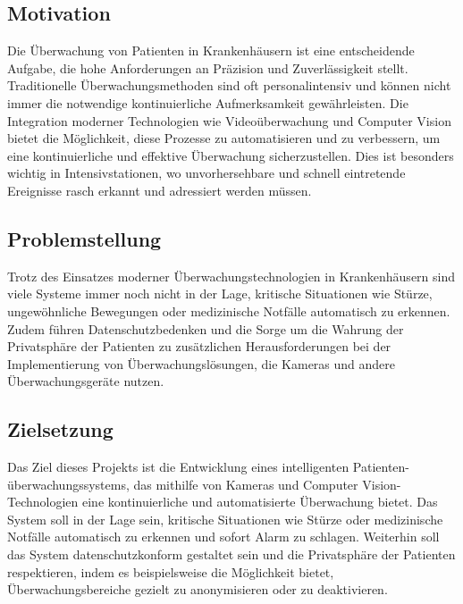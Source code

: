 \clearpage
\subsection{Motivation}
Die Überwachung von Patienten in Krankenhäusern ist eine entscheidende Aufgabe, die hohe Anforderungen an Präzision und Zuverlässigkeit stellt. Traditionelle Überwachungsmethoden sind oft personalintensiv und können nicht immer die notwendige kontinuierliche Aufmerksamkeit gewährleisten. Die Integration moderner Technologien wie Videoüberwachung und Computer Vision bietet die Möglichkeit, diese Prozesse zu automatisieren und zu verbessern, um eine kontinuierliche und effektive Überwachung sicherzustellen. Dies ist besonders wichtig in Intensivstationen, wo unvorhersehbare und schnell eintretende Ereignisse rasch erkannt und adressiert werden müssen.

\subsection{Problemstellung}
Trotz des Einsatzes moderner Überwachungstechnologien in Krankenhäusern sind viele Systeme immer noch nicht in der Lage, kritische Situationen wie Stürze, ungewöhnliche Bewegungen oder medizinische Notfälle automatisch zu erkennen. Zudem führen Datenschutzbedenken und die Sorge um die Wahrung der Privatsphäre der Patienten zu zusätzlichen Herausforderungen bei der Implementierung von Überwachungslösungen, die Kameras und andere Überwachungsgeräte nutzen.

\subsection{Zielsetzung}
Das Ziel dieses Projekts ist die Entwicklung eines intelligenten Patienten- überwachungssystems, das mithilfe von Kameras und Computer Vision-Technologien eine kontinuierliche und automatisierte Überwachung bietet. Das System soll in der Lage sein, kritische Situationen wie Stürze oder medizinische Notfälle automatisch zu erkennen und sofort Alarm zu schlagen. Weiterhin soll das System datenschutzkonform gestaltet sein und die Privatsphäre der Patienten respektieren, indem es beispielsweise die Möglichkeit bietet, Überwachungsbereiche gezielt zu anonymisieren oder zu deaktivieren.

